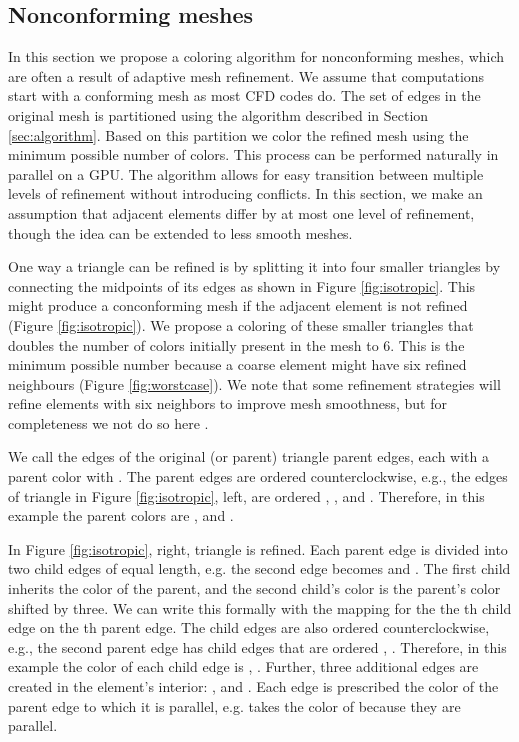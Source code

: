 \documentclass[12pt]{article}
\begin{document}
\subsection{Nonconforming meshes}
In this section we propose a coloring algorithm for nonconforming meshes, which are often a result of adaptive mesh refinement.  We assume that computations start with a conforming mesh as most CFD codes do.  The set of edges in the original mesh is partitioned using the algorithm described in Section \ref{sec:algorithm}.  Based on this partition we color the refined mesh using the minimum possible number of colors.  This process can be performed naturally in parallel on a GPU.  The algorithm allows for easy transition between multiple levels of refinement without introducing conflicts.  In this section, we make an assumption that adjacent elements differ by at most one level of refinement, though the idea can be extended to less smooth meshes.  

One way a triangle can be refined is by splitting it into four smaller triangles by connecting the midpoints of its edges as shown in Figure \ref{fig:isotropic}.  This might produce a conconforming mesh if the adjacent element is not refined (Figure \ref{fig:isotropic}).  We propose a coloring of these smaller triangles that doubles the number of colors initially present in the mesh to 6.  This is the minimum possible number because a coarse element might have six refined neighbours (Figure \ref{fig:worstcase}).  We note that some refinement strategies will refine elements with six neighbors to improve mesh smoothness, but for completeness we not do so here \cite{dealii}.

We call the edges of the original (or parent) triangle parent edges, each with a parent color  with .  The parent edges are ordered counterclockwise, e.g., the edges of triangle  in Figure \ref{fig:isotropic}, left, are ordered , , and .  Therefore, in this example the parent colors are ,  and .

In Figure \ref{fig:isotropic}, right, triangle  is refined.  Each parent edge is divided into two child edges of equal length, e.g. the second edge  becomes  and .  The first child inherits the color of the parent, and the second child's color is the parent's color shifted by three.  We can write this formally with the mapping  for the the th child edge on the th parent edge. The child edges are also ordered counterclockwise, e.g., the second parent edge  has child edges that are ordered , .  Therefore, in this example the color of each child edge is , . Further, three additional edges are created in the element's interior: ,  and .  Each edge is prescribed the color of the parent edge to which it is parallel, e.g.  takes the color of  because they are parallel.
\end{document}
